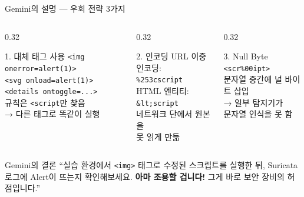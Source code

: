 \documentclass[aspectratio=169,10pt]{beamer}
\newcommand{\hlt}[1]{\textcolor{accent}{\textbf{#1}}}
\begin{document}
\begin{frame}[shrink=3]{Gemini의 설명 — 우회 전략 3가지}

\begin{columns}[T]
\begin{column}{0.32\textwidth}
\begin{block}{1. 대체 태그 사용}
{\scriptsize
\texttt{<img onerror=alert(1)>}\\
\texttt{<svg onload=alert(1)>}\\
\texttt{<details ontoggle=...>}\\[3pt]
규칙은 \texttt{<script}만 찾음\\
→ 다른 태그로 똑같이 실행
}
\end{block}
\end{column}
\begin{column}{0.32\textwidth}
\begin{block}{2. 인코딩}
{\scriptsize
URL 이중 인코딩:\\
\texttt{\%253cscript}\\[3pt]
HTML 엔티티:\\
\texttt{\&lt;script}\\[3pt]
네트워크 단에서 원본을\\못 읽게 만듦
}
\end{block}
\end{column}
\begin{column}{0.32\textwidth}
\begin{block}{3. Null Byte}
{\scriptsize
\texttt{<scr\%00ipt>}\\[3pt]
문자열 중간에 널 바이트 삽입\\
→ 일부 탐지기가\\문자열 인식을 못 함
}
\end{block}
\end{column}
\end{columns}

\vspace{0.3em}
\begin{alertblock}{Gemini의 결론}
``실습 환경에서 \texttt{<img>} 태그로 수정된 스크립트를 실행한 뒤, Suricata 로그에 Alert이 뜨는지 확인해보세요.
\hlt{아마 조용할 겁니다!} 그게 바로 보안 장비의 허점입니다.''
\end{alertblock}
\end{frame}
\end{document}

